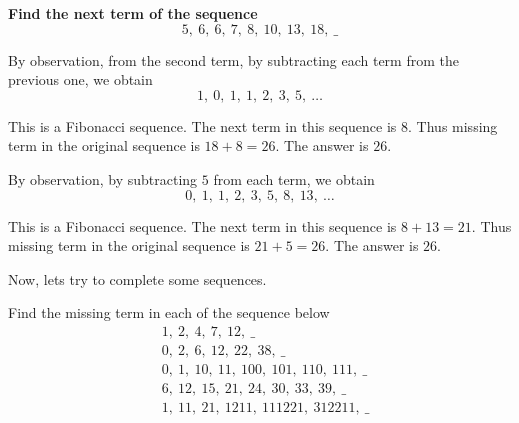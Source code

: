 \documentclass{article}
\begin{document}
\begin{problem*} \textbf{Find the next term of the sequence}
    \[
        5,\ 6,\ 6,\ 7,\ 8,\ 10,\ 13,\ 18,\ \_
    \]
\end{problem*}

\begin{soln}
    By observation, from the second term, by subtracting each term from the previous one, we obtain
    \[
        1,\ 0,\ 1,\ 1,\ 2,\ 3,\ 5,\ \ldots
    \]
    
    This is a Fibonacci sequence. The next term in this sequence is $8.$ 
    Thus missing term in the original sequence is $18+8=26.$
    The answer is $\boxed{26.}$
\end{soln}

\begin{soln}
    By observation, by subtracting $5$ from each term, we obtain
    \[
        0,\ 1,\ 1,\ 2,\ 3,\ 5,\ 8,\ 13,\ \ldots
    \]
    
    This is a Fibonacci sequence. The next term in this sequence is $8+13=21.$ 
    Thus missing term in the original sequence is $21+5=26.$
    The answer is $\boxed{26.}$
\end{soln}

Now, lets try to complete some sequences.

\begin{exercise*}
    Find the missing term in each of the sequence below
    \[
        \begin{aligned}
            &1,\ 2,\ 4,\ 7,\ 12,\ \_\\
            &0,\ 2,\ 6,\ 12,\ 22,\ 38,\ \_\\
            &0,\ 1,\ 10,\ 11,\ 100,\ 101,\ 110,\ 111,\ \_\\
            &6,\ 12,\ 15,\ 21,\ 24,\ 30,\ 33,\ 39,\ \_\\
            &1,\ 11,\ 21,\ 1211,\ 111221,\ 312211,\ \_
        \end{aligned}
    \]
\end{exercise*}
\end{document}
